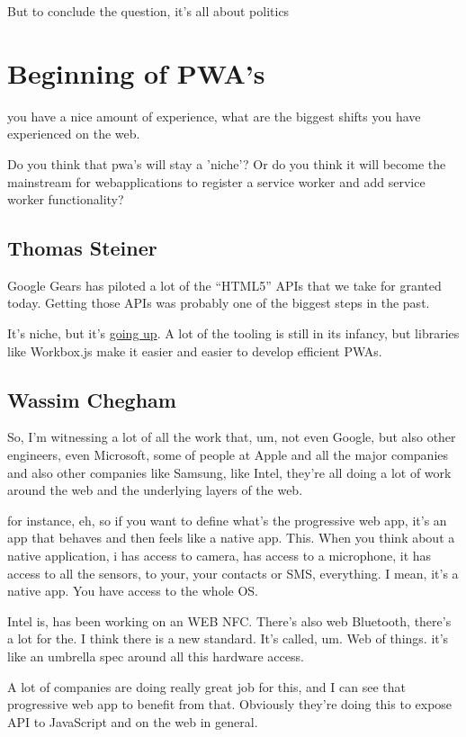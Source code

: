 			But to conclude the question, it's all about politics
		
	\section{Beginning of PWA's}
		you have a nice amount of experience, what are the biggest shifts you have experienced on the web. 
		
		Do you think that pwa's will stay a 'niche'? Or do you think it will become the mainstream for webapplications to register a service worker and add service worker functionality?
		\subsection{Thomas Steiner}
			Google Gears has piloted a lot of the “HTML5” APIs that we take for granted today. Getting those APIs was probably one of the biggest steps in the past.
			
			It’s niche, but it’s \href{https://httparchive.org/reports/progressive-web-apps#swControlledPages}{going up}. A lot of the tooling is still in its infancy, but libraries like Workbox.js make it easier and easier to develop efficient PWAs.
		
		\subsection{Wassim Chegham}
			So, I'm witnessing a lot of all the work that, um, not even Google, but also other engineers, even Microsoft, some of people at Apple and all the major companies and also other companies like Samsung, like Intel, they're all doing a lot of work around the web and the underlying layers of the web.
			
			for instance, eh, so if you want to define what's the progressive web app, it's an app that behaves and then feels like a native app. This. When you think about a native application, i has access to camera, has access to a microphone, it has access to all the sensors, to your, your contacts or SMS, everything. I mean, it's a native app. You have access to the whole OS.
			
			Intel is, has been working on an WEB NFC. There's also web Bluetooth, there's a lot for the. I think there is a new standard. It's called, um. Web of things. it's like an umbrella spec around all this hardware access.
			
			A lot of companies are doing really great job for this, and I can see that progressive web app to benefit from that. Obviously they're doing this to expose API to JavaScript and on the web in general. 
			
